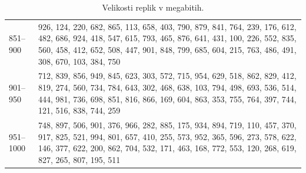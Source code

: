 \documentclass[a4paper, 12pt]{book}
\begin{document}
\begin{table}
\begin{center}
\begin{tabulary}{1.0\textwidth}{p{1.3cm} p{11.58cm}}
      851--900 & 926, 124, 220, 682, 865, 113, 658, 403, 790, 879, 841, 764, 239, 176, 612, 482, 686, 924, 418, 547, 615, 793, 465, 876, 641, 431, 100, 226, 552, 835, 560, 458, 412, 652, 508, 447, 901, 848, 799, 685, 604, 215, 763, 486, 491, 308, 670, 103, 384, 750 \\
      901--950 & 712, 839, 856, 949, 845, 623, 303, 572, 715, 954, 629, 518, 862, 829, 412, 819, 274, 560, 734, 784, 643, 302, 468, 638, 103, 794, 498, 693, 536, 514, 444, 981, 736, 698, 851, 816, 866, 169, 604, 863, 353, 755, 764, 397, 744, 121, 516, 838, 744, 259 \\
      951--1000 & 748, 897, 506, 901, 376, 966, 282, 885, 175, 934, 894, 719, 110, 457, 370, 917, 825, 521, 994, 801, 657, 410, 255, 573, 952, 365, 596, 273, 578, 622, 146, 377, 622, 200, 862, 704, 532, 171, 463, 168, 772, 553, 120, 268, 619, 827, 265, 807, 195, 511 \\
    \end{tabulary}
  \end{center}

  \caption{Velikosti replik v megabitih.}
  \label{tbl:sim_replica_sizes}
\end{table}
\end{document}
